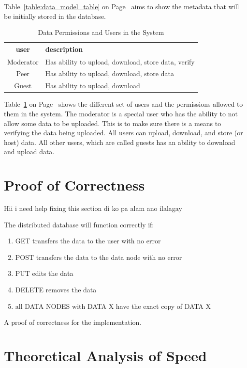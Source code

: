 \documentclass[acmsmall]{acmart}
\begin{document}
Table~\ref{table:data_model_table} on Page~\pageref{table:data_model_table} aims to show the metadata that will be initially stored in the database.


\begin{table}[h]
\caption{Data Permissions and Users in the System}
\label{table:data_perm_table}
\begin{tabular}{cl}
    \toprule
    user & description \\
    \midrule
   Moderator & Has ability to upload, download, store data, verify \\
    Peer & Has ability to upload, download, store data \\
    Guest & Has ability to upload, download \\
   \bottomrule 
\end{tabular}
\end{table}

Table~\ref{table:data_perm_table} on Page~\pageref{table:data_perm_table} shows the different set of users and the permissions allowed to them in the system. The moderator is a special user who has the ability to not allow some data to be uploaded. This is to make sure there is a means to verifying the data being uploaded. All users can upload, download, and store (or host) data. All other users, which are called guests has an ability to download and upload data.


\section{Proof of Correctness}
Hii i need help fixing this section di ko pa alam ano ilalagay

The distributed database will function correctly if:

\begin{enumerate}
    \item GET transfers the data to the user with no error
    \item POST transfers the data to the data node with no error
    \item PUT edits the data
    \item DELETE removes the data
    \item all DATA NODES with DATA X have the exact copy of DATA X
\end{enumerate}

A proof of correctness for the implementation.

\section{Theoretical Analysis of Speed} 
\end{document}
